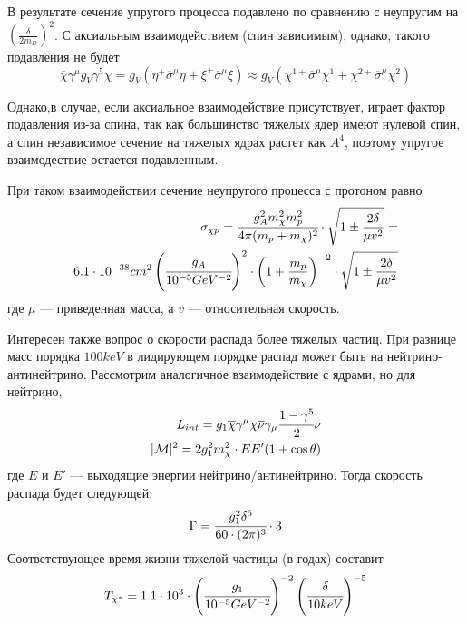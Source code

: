 В результате сечение упругого процесса подавлено по сравнению с неупругим на $\left(\frac{\delta}{2m_D}\right)^2$. С аксиальным взаимодействием (спин зависимым), однако, такого подавления не будет
\begin{equation}
	\overline{\chi}\gamma^{\mu}g_V \gamma^5 \chi = 
	g_V(\eta^+ \overline{\sigma}^{\mu} \eta + \xi^+ \overline{\sigma}^{\mu} \xi) \approx  
 g_V (\chi^{1+} \overline{\sigma}^{\mu} \chi^1 + \chi^{2+} \overline{\sigma}^{\mu} \chi^2)
\end{equation}

Однако,в случае, если аксиальное взаимодействие присутствует, играет фактор подавления из-за спина, так как большинство тяжелых ядер имеют нулевой спин, а спин независимое сечение на тяжелых ядрах растет как $A^4$, поэтому упругое взаимодествие остается подавленным.

При таком взаимодействии сечение неупругого процесса с протоном равно
\begin{equation}
\begin{split}
	\sigma_{\chi p} = 
	\cfrac{g_A^2m_{\chi}^2m_{p}^2}{4\pi(m_{p}+m_{\chi})^2}\cdot
	\sqrt{1\pm\frac{2\delta}{\mu v^2}} = \\ 
	{6.1}\cdot 10^{-38} cm^2
	\left(\cfrac{g_A}{10^{-5} GeV^{-2}}\right)^2  \cdot \left(1 + \frac{m_p}{m_{\chi}}\right)^{-2} \cdot \sqrt{1\pm\frac{2\delta}{\mu v^2}}
\end{split}	
\end{equation}
где $\mu$ --- приведенная масса, а $v$ --- относительная скорость. 


Интересен также вопрос о скорости распада более тяжелых частиц. При разнице масс порядка $100 keV$ в лидирующем порядке распад может быть на нейтрино-антинейтрино. Рассмотрим аналогичное взаимодействие с ядрами, но для нейтрино,
\begin{equation}
\begin{split}
	L_{int} = g_1\overline{\chi}\gamma^{\mu}\chi\overline{\nu}\gamma_{\mu}\cfrac{1-\gamma^5}{2}\nu\\
	|\mathcal{M}|^2= 2g_1^2m_{\chi}^2 \cdot EE'(1+\cos{\theta})
\end{split}
\end{equation}
где $E$ и $E'$ --- выходящие энергии нейтрино/антинейтрино. Тогда скорость распада будет следующей:
\begin{equation}
	\Gamma = \cfrac{g_1^2\delta^5}{60\cdot(2\pi)^3}\cdot 3
\end{equation}
Соответствующее время жизни тяжелой частицы (в годах) составит
\begin{equation}
	T_{\chi^*} = {1.1}\cdot 10^{3} \cdot \left(\cfrac{g_1}{10^{-5} GeV^{-2}}\right)^{-2} 
	\left(\cfrac{\delta}{10 keV}\right)^{-5}
\end{equation}

